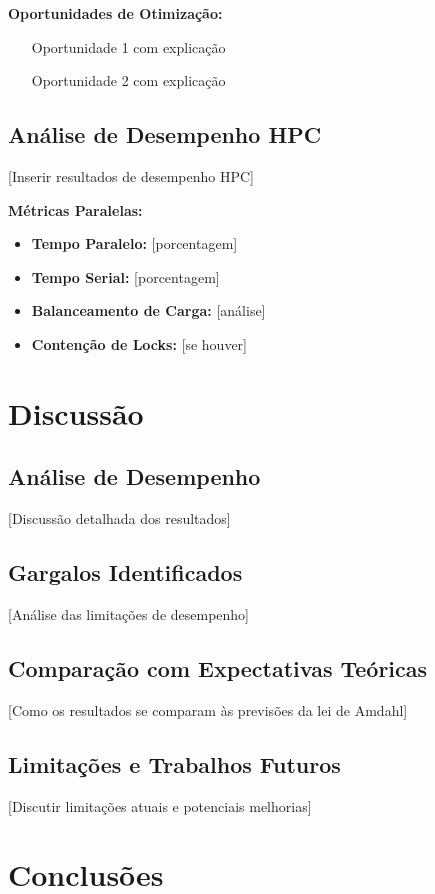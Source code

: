\documentclass[a4paper,11pt]{article}
\begin{document}
\textbf{Oportunidades de Otimização:}
\begin{itemize}
    \item [Oportunidade 1 com explicação]
    \item [Oportunidade 2 com explicação]
\end{itemize}

\subsection{Análise de Desempenho HPC}

[Inserir resultados de desempenho HPC]

\textbf{Métricas Paralelas:}
\begin{itemize}
    \item \textbf{Tempo Paralelo:} [porcentagem]
    \item \textbf{Tempo Serial:} [porcentagem]
    \item \textbf{Balanceamento de Carga:} [análise]
    \item \textbf{Contenção de Locks:} [se houver]
\end{itemize}

\section{Discussão}

\subsection{Análise de Desempenho}
[Discussão detalhada dos resultados]

\subsection{Gargalos Identificados}
[Análise das limitações de desempenho]

\subsection{Comparação com Expectativas Teóricas}
[Como os resultados se comparam às previsões da lei de Amdahl]

\subsection{Limitações e Trabalhos Futuros}
[Discutir limitações atuais e potenciais melhorias]

\section{Conclusões}
\end{document}
